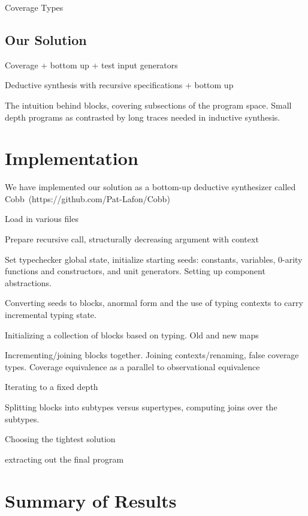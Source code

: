 \documentclass[review, sigplan]{acmart}
\begin{document}
Coverage Types\cite{Poirot}

\subsection{Our Solution}

Coverage + bottom up + test input generators

Deductive synthesis with recursive specifications + bottom up

The intuition behind blocks, covering subsections of the program space. Small
depth programs as contrasted by long traces needed in inductive synthesis.

\section{Implementation}
We have implemented our solution as a bottom-up deductive synthesizer called
Cobb~(https://github.com/Pat-Lafon/Cobb)

Load in various files

Prepare recursive call, structurally decreasing argument with context

Set typechecker global state, initialize starting seeds: constants, variables,
0-arity functions and constructors, and unit generators. Setting up component
abstractions.

Converting seeds to blocks, anormal form and the use of typing contexts to carry
incremental typing state.

Initializing a collection of blocks based on typing. Old and new maps

Incrementing/joining blocks together. Joining contexts/renaming, false coverage
types. Coverage equivalence as a parallel to observational equivalence

Iterating to a fixed depth

Splitting blocks into subtypes versus supertypes, computing joins over the
subtypes.

Choosing the tightest solution

extracting out the final program

\section{Summary of Results}
\end{document}
